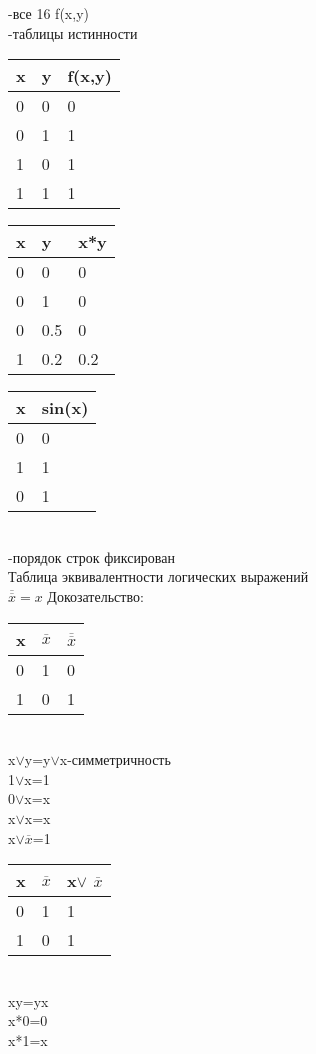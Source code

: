 \documentclass{article}
\begin{document}
-все 16 f(x,y)\\
-таблицы истинности\\
\begin{tabular}{ll|l}
 x&y&f(x,y)\\
\hline
0 & 0 &0\\
0 &  1 & 1\\
1 &  0 & 1\\
1&  1 & 1\\
\end{tabular}\quad
\begin{tabular}{ll|l}
 x&y&x*y\\
\hline
0 & 0 &0\\
0 & 1 & 0\\
0 & 0.5 & 0\\
1&  0.2 & 0.2\\
\end{tabular} \quad
\begin{tabular}{l|l}
 x&sin(x)\\
\hline
 0 &0\\
 1 & 1\\
 0 & 1\\
\end{tabular}\\
-порядок строк фиксирован\\
Таблица эквивалентности логических выражений\\
$\overline{\overline{x}}=x$ \quad
Докозательство: \begin{tabular}{l|l|l}
x&$\overline{x}$&$\overline{\overline{x}}$\\
\hline
0 &1&0\\
1 &0&1\\
\end{tabular}\\
x$\vee$y=y$\vee$x-симметричность\\
1$\vee$x=1\\
0$\vee$x=x\\
x$\vee$x=x\\
x$\vee \overline{x}$=1\\
\begin{tabular}{l|l|l}
x&$\overline{x}$&x$\vee$ $\overline{x}$\\
\hline
0 & 1& 1\\
1 & 0& 1\\
\end{tabular}\\
xy=yx\\
x*0=0\\
x*1=x\\
\end{document}
